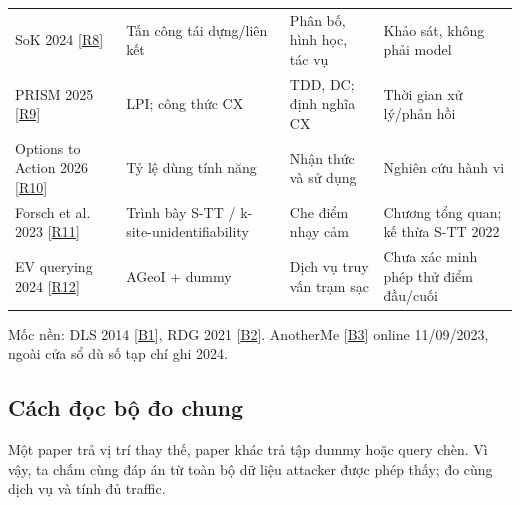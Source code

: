 \begin{longtable}{@{}P{3.871cm}P{4.355cm}P{3.871cm}P{4.258cm}@{}}
\addlinespace[3pt]
SoK 2024 [\href{https://petsymposium.org/popets/2024/popets-2024-0068.pdf}{R8}] & Tấn công tái dựng/liên kết & Phân bố, hình học, tác vụ & Khảo sát, không phải model\\
\addlinespace[3pt]
PRISM 2025 [\href{https://www.sciencedirect.com/science/article/pii/S1084804525001687}{R9}] & LPI; công thức CX & TDD, DC; định nghĩa CX & Thời gian xử lý/phản hồi\\
\addlinespace[3pt]
Options to Action 2026 [\href{https://elathan.github.io/papers/chi26.pdf}{R10}] & Tỷ lệ dùng tính năng & Nhận thức và sử dụng & Nghiên cứu hành vi\\
\addlinespace[3pt]
Forsch et al. 2023 [\href{https://link.springer.com/chapter/10.1007/978-3-031-35374-1_3}{R11}] & Trình bày S-TT / k-site-unidentifiability & Che điểm nhạy cảm & Chương tổng quan; kế thừa S-TT 2022\\
\addlinespace[3pt]
EV querying 2024 [\href{https://wrap.warwick.ac.uk/id/eprint/183198/1/WRAP-privacy-preserving-querying-mechanism-high-utility-electric-vehicles-2024.pdf}{R12}] & AGeoI + dummy & Dịch vụ truy vấn trạm sạc & Chưa xác minh phép thử điểm đầu/cuối\\
\end{longtable}
\endgroup
Mốc nền: DLS 2014 [\href{https://doi.org/10.1109/INFOCOM.2014.6848002}{B1}], RDG 2021 [\href{https://doi.org/10.1109/TMC.2020.2993599}{B2}]. AnotherMe [\href{https://ieeexplore.ieee.org/document/10246991/}{B3}] online 11/09/2023, ngoài cửa sổ dù số tạp chí ghi 2024.

\subsection{Cách đọc bộ đo chung}
Một paper trả vị trí thay thế, paper khác trả tập dummy hoặc query chèn. Vì vậy, ta chấm cùng đáp án từ toàn bộ dữ liệu attacker được phép thấy; đo cùng dịch vụ và tính đủ traffic.

